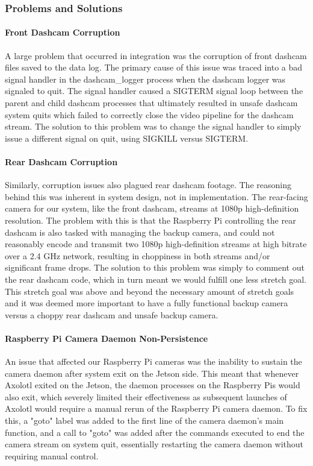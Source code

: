 \documentclass[onecolumn, draftclsnofoot, 10pt, compsoc]{IEEEtran}
\begin{document}
\subsubsection{Problems and Solutions}
\paragraph{\textbf{Front Dashcam Corruption}}
A large problem that occurred in integration was the corruption of front dashcam files saved to the data log. The primary cause of this issue was traced into a bad signal handler in the dashcam\_logger process when the dashcam logger was signaled to quit. The signal handler caused a SIGTERM signal loop between the parent and child dashcam processes that ultimately resulted in unsafe dashcam system quits which failed to correctly close the video pipeline for the dashcam stream. The solution to this problem was to change the signal handler to simply issue a different signal on quit, using SIGKILL versus SIGTERM.

\paragraph{\textbf{Rear Dashcam Corruption}}
Similarly, corruption issues also plagued rear dashcam footage. The reasoning behind this was inherent in system design, not in implementation. The rear-facing camera for our system, like the front dashcam, streams at 1080p high-definition resolution. The problem with this is that the Raspberry Pi controlling the rear dashcam is also tasked with managing the backup camera, and could not reasonably encode and transmit two 1080p high-definition streams at high bitrate over a 2.4 GHz network, resulting in choppiness in both streams and/or significant frame drops. The solution to this problem was simply to comment out the rear dashcam code, which in turn meant we would fulfill one less stretch goal. This stretch goal was above and beyond the necessary amount of stretch goals and it was deemed more important to have a fully functional backup camera versus a choppy rear dashcam and unsafe backup camera.

\paragraph{\textbf{Raspberry Pi Camera Daemon Non-Persistence}}
An issue that affected our Raspberry Pi cameras was the inability to sustain the camera daemon after system exit on the Jetson side. This meant that whenever Axolotl exited on the Jetson, the daemon processes on the Raspberry Pis would also exit, which severely limited their effectiveness as subsequent launches of Axolotl would require a manual rerun of the Raspberry Pi camera daemon. To fix this, a "goto" label was added to the first line of the camera daemon's main function, and a call to "goto" was added after the commands executed to end the camera stream on system quit, essentially restarting the camera daemon without requiring manual control.
\end{document}
